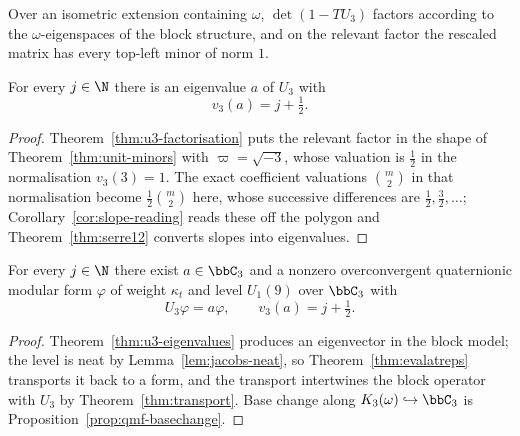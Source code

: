 \begin{theorem}
  \label{thm:u3-factorisation}
  \leanok
  Over an isometric extension containing $\omega$, $\det(1 - TU_3)$ factors according to the
  $\omega$-eigenspaces of the block structure, and on the relevant factor the rescaled matrix has
  every top-left minor of norm $1$.
\end{theorem}

\begin{theorem}
  \label{thm:u3-eigenvalues}
  \leanok
  For every $j \in \N$ there is an eigenvalue $a$ of $U_3$ with
  \[
    v_3(a) = j + \tfrac12 .
  \]
\end{theorem}

\begin{proof}
  \leanok
  Theorem~\ref{thm:u3-factorisation} puts the relevant factor in the shape of
  Theorem~\ref{thm:unit-minors} with $\varpi = \sqrt{-3}$, whose valuation is $\tfrac12$ in the
  normalisation $v_3(3) = 1$.  The exact coefficient valuations $\binom m2$ in that normalisation
  become $\tfrac12\binom m2$ here, whose successive differences are $\tfrac12, \tfrac32, \dots$;
  Corollary~\ref{cor:slope-reading} reads these off the polygon and
  Theorem~\ref{thm:serre12} converts slopes into eigenvalues.
\end{proof}

\begin{theorem}
  \label{thm:u3-eigenforms}
  \leanok
  For every $j \in \N$ there exist $a \in \bbC_3$ and a nonzero overconvergent quaternionic
  modular form $\varphi$ of weight $\kappa_t$ and level $U_1(9)$ over $\bbC_3$ with
  \[
    U_3 \varphi = a\varphi, \qquad v_3(a) = j + \tfrac12 .
  \]
\end{theorem}

\begin{proof}
  \leanok
  Theorem~\ref{thm:u3-eigenvalues} produces an eigenvector in the block model; the level is neat
  by Lemma~\ref{lem:jacobs-neat}, so Theorem~\ref{thm:evalatreps} transports it back to a form,
  and the transport intertwines the block operator with $U_3$ by Theorem~\ref{thm:transport}.
  Base change along $K_3(\omega) \hookrightarrow \bbC_3$ is
  Proposition~\ref{prop:qmf-basechange}.
\end{proof}

